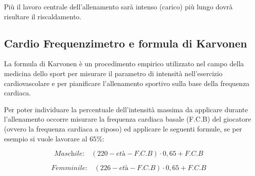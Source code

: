 Più il lavoro centrale dell'allenamento  sarà intenso (carico) più lungo
dovrà risultare il riscaldamento.

\subsection{Cardio Frequenzimetro e formula di Karvonen}
La formula di Karvonen è un procedimento empirico utilizzato nel campo della medicina dello sport per misurare il parametro di intensità nell'esercizio cardiovascolare e per pianificare l'allenamento sportivo sulla base della frequenza cardiaca.

Per poter individuare la percentuale dell'intensità massima da applicare durante l'allenamento occorre misurare la frequenza cardiaca basale (F.C.B) del giocatore
(ovvero la frequenza cardiaca a riposo) ed applicare le seguenti formule,
se per esempio si vuole lavorare al $65$\%:
\begin{flushleft}
 \[
\textit{Maschile:} \quad
 \left( 220 - \textit{età} - \textit{F.C.B} \right) \cdot 0,65 + \textit{F.C.B}
 \]
\end{flushleft}
\begin{flushleft}
 \[
\textit{Femminile:} \quad
 \left( 226 - \textit{età} - \textit{F.C.B} \right) \cdot 0,65 + \textit{F.C.B}
 \]
\end{flushleft}